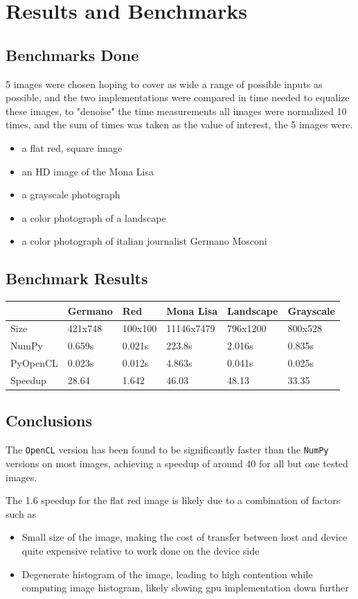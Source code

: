 \documentclass[11pt]{article}
\begin{document}
\newpage
\section{Results and Benchmarks}
\label{sec:orge9dcc85}
\subsection{Benchmarks Done}
\label{sec:org19bac97}
5 images were chosen hoping to cover as wide a range of possible inputs as possible, and the two implementations were compared in time needed to equalize these images, to "denoise" the time measurements all images were normalized 10 times, and the sum of times was taken as the value of interest, the 5 images were.
\begin{itemize}
\item a flat red, square image
\item an HD image of the Mona Lisa
\item a grayscale photograph
\item a color photograph of a landscape
\item a color photograph of italian journalist Germano Mosconi
\end{itemize}
\subsection{Benchmark Results}
\label{sec:org73f06f8}
\begin{center}
\begin{tabular}{llllll}
 & Germano & Red & Mona Lisa & Landscape & Grayscale\\
\hline
Size & 421x748 & 100x100 & 11146x7479 & 796x1200 & 800x528\\
NumPy & 0.659s & 0.021s & 223.8s & 2.016s & 0.835s\\
PyOpenCL & 0.023s & 0.012s & 4.863s & 0.041s & 0.025s\\
Speedup & 28.64 & 1.642 & 46.03 & 48.13 & 33.35\\
\end{tabular}
\end{center}
\subsection{Conclusions}
\label{sec:org977f056}
The \texttt{OpenCL} version has been found to be significantly faster than the \texttt{NumPy} versions on most images, achieving a speedup of around 40 for all but one tested images.

The 1.6 speedup for the flat red image is likely due to a combination of factors such as
\begin{itemize}
\item Small size of the image, making the cost of transfer between host and device quite expensive relative to work done on the device side
\item Degenerate histogram of the image, leading to high contention while computing image histogram, likely slowing gpu implementation down further
\end{itemize}
\end{document}
